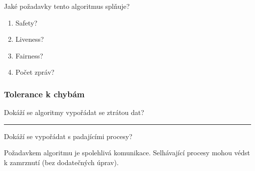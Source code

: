 \documentclass[usenames,dvipsnames,9pt]{beamer}
\begin{document}
\begin{frame}

\begin{center}
\Large Jaké požadavky tento algoritmus splňuje?
\end{center}

\begin{minipage}{0.4\linewidth}
  \begin{enumerate}
  \item Safety? \uncover<2->{\textcolor{green}{TRUE}}
  \item Liveness? 
  \item Fairness? 
  \item Počet zpráv? 
  \end{enumerate}
\end{minipage}
\hfill
\begin{minipage}{0.5\linewidth}
\end{minipage}

\end{frame}

\begin{frame}
\frametitle{Tolerance k chybám}

\begin{center}
\Large Dokáží se algoritmy vypořádat se ztrátou dat?
\end{center}
\pause\vspace{1em}\hrule\vspace{1em}

\begin{center}
\Large Dokáží se vypořádat s padajícími procesy?
\end{center}

\pause \vspace{1em}

\faWarning Požadavkem algoritmu je spolehlivá komunikace. Selhávající procesy mohou védst k zamrznutí (bez dodatečných úprav).

\end{frame}
\end{document}
